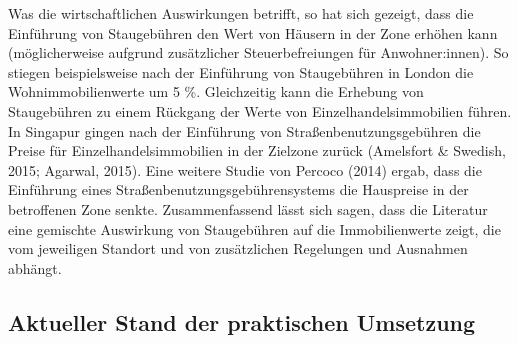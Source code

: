 \documentclass[
]{book}
\begin{document}
Was die wirtschaftlichen Auswirkungen betrifft, so hat sich gezeigt, dass die Einführung von Staugebühren den Wert von Häusern in der Zone erhöhen kann (möglicherweise aufgrund zusätzlicher Steuerbefreiungen für Anwohner:innen). So stiegen beispielsweise nach der Einführung von Staugebühren in London die Wohnimmobilienwerte um 5 \%. Gleichzeitig kann die Erhebung von Staugebühren zu einem Rückgang der Werte von Einzelhandelsimmobilien führen. In Singapur gingen nach der Einführung von Straßenbenutzungsgebühren die Preise für Einzelhandelsimmobilien in der Zielzone zurück (Amelsfort \& Swedish, 2015; Agarwal, 2015). Eine weitere Studie von Percoco (2014) ergab, dass die Einführung eines Straßenbenutzungsgebührensystems die Hauspreise in der betroffenen Zone senkte. Zusammenfassend lässt sich sagen, dass die Literatur eine gemischte Auswirkung von Staugebühren auf die Immobilienwerte zeigt, die vom jeweiligen Standort und von zusätzlichen Regelungen und Ausnahmen abhängt.

\hypertarget{aktueller-stand-der-praktischen-umsetzung-9}{%
\subsection*{Aktueller Stand der praktischen Umsetzung}\label{aktueller-stand-der-praktischen-umsetzung-9}}
\end{document}
